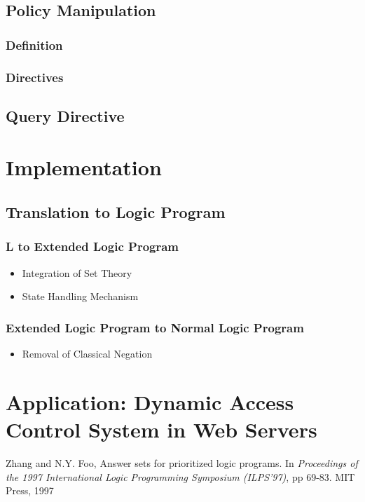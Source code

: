 \documentclass{llncs}
\begin{document}
    \subsection{Policy Manipulation}

      \subsubsection{Definition}

      \subsubsection{Directives}

    \subsection{Query Directive}

  \newpage
  \section{Implementation}

    \subsection{Translation to Logic Program}

      \subsubsection{L to Extended Logic Program}

        \begin{itemize}
          \item Integration of Set Theory
          \item State Handling Mechanism
        \end{itemize}

      \subsubsection{Extended Logic Program to Normal Logic Program}

        \begin{itemize}
          \item Removal of Classical Negation
        \end{itemize}

  \newpage
  \section{Application: Dynamic Access Control System in Web Servers}

  \begin{thebibliography}{5}

      Zhang and N.Y. Foo,
      Answer sets for prioritized logic programs.
      In {\em Proceedings of the 1997 International Logic Programming
      Symposium (ILPS'97)},
      pp 69-83. 
      MIT Press, 1997

  \end{thebibliography}
\end{document}
